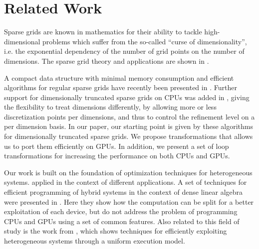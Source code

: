 \section{Related Work}
\label{sec:related_work}
Sparse grids are known in mathematics for their ability to tackle high-dimensional problems which suffer from the so-called ``curse of dimensionality'', i.e. the exponential dependency of the number of grid points on the number of dimensions. The sparse grid theory and applications are shown in \cite{CambridgeJournals:227245}.

A compact data structure with minimal memory consumption and efficient
algorithms for regular sparse grids have recently been presented in
\cite{Murarasu:2011:CDS:1941553.1941559}. Further support for dimensionally
truncated sparse grids on CPUs was added in \cite{murarasu12fastsg:}, giving the
flexibility to treat dimensions differently, by allowing more or less
discretization points per dimensions, and thus to control the refinement level on a per dimension
basis. In our paper, our starting point is given by these algorithms for dimensionally
truncated sparse grids. We propose transformations that allows us to port them efficiently on GPUs. In addition, we present
a set of loop transformations for increasing the performance on both CPUs and GPUs.

Our work is built on the foundation of optimization techniques for heterogeneous systems.
applied in the context of different applications. 
A set of techniques for efficient programming of hybrid systems in the context
of dense linear algebra were presented in \cite{Tomov:2010:TDL:1805333.1805388}.
Here they show how the computation can be split for a better exploitation of
each device, but do not address the problem of programming CPUs and GPUs using a
set of common features. Also related to this field of study is the work from
\cite{Augonnet:2011:SUP:1951453.1951454}, which shows techniques for efficiently
exploiting heterogeneous systems through a uniform execution model.

